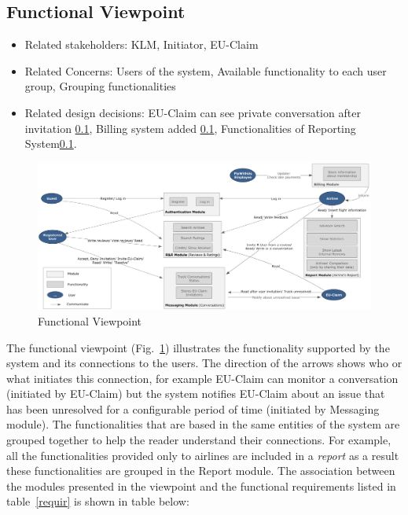% 

\subsection{Functional Viewpoint}

\begin{itemize}
\item Related stakeholders: KLM, Initiator, EU-Claim
\item Related Concerns: Users of the system, Available functionality to each user group, Grouping functionalities
\item Related design decisions: EU-Claim can see private conversation after invitation \ref{}, Billing system added \ref{}, Functionalities of Reporting System\ref{}.
\end{itemize}

\newpage
\begin{landscape}
\begin{figure}
\includegraphics[width=600px]{Functional_Viewpoint.jpg}
\caption{Functional Viewpoint}
\label{fig:functional}
\end{figure}
\end{landscape}

The functional viewpoint (Fig.~\ref{fig:functional}) illustrates the functionality supported by the system and its connections to the users. The direction of the arrows shows who or what initiates this connection, for example EU-Claim can monitor a conversation (initiated by EU-Claim) but  the system notifies EU-Claim about an issue that has been unresolved for a configurable period of time (initiated by Messaging module). The functionalities that are based in the same entities of the system are grouped together to help the reader understand their connections. For example, all the functionalities  provided only to airlines are included in a {\em report} as a result these functionalities are grouped in the Report module. The association between the modules presented in the viewpoint and the functional requirements listed in table~\ref{requir} is shown in table below:

